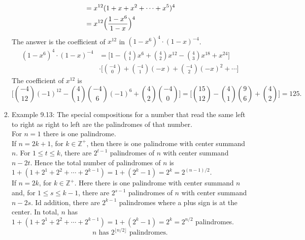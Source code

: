 \documentclass[a4paper]{article}
\begin{document}
\begin{enumerate}
\begin{align*}
        &=x^{12}(1+x+x^2+\cdots+x^5)^4\\
        &=x^{12}\Bigl(\frac{1-x^6}{1-x}\Bigr)^4
    \end{align*}
    The answer is the coefficient of $x^{12}$ in $(1-x^6)^4\cdot (1-x)^{-4}$.
    \begin{align*}
        (1-x^6)^4\cdot (1-x)^{-4}&=\Bigg[1-\binom{4}{1}x^6+\binom{4}{2}x^{12}-\binom{4}{3}x^{18}+x^{24}\Bigg]\\
        &\cdot\Bigg[\binom{-4}{0}+\binom{-4}{1}(-x)+\binom{-4}{2}(-x)^2+\cdots\Bigg]
    \end{align*}
    The coefficient of $x^{12}$ is
    $$
    \Bigg[\binom{-4}{12}(-1)^{12}-\binom{4}{1}\binom{-4}{6}(-1)^6+\binom{4}{2}\binom{-4}{0}\Bigg]=\Bigg[\binom{15}{12}-\binom{4}{1}\binom{9}{6}+\binom{4}{2}\Bigg]=125.
    $$
    \item Example 9.13: The special compositions for a number that read the same left to right as right to left are the palindromes of that number.\\
    For $n=1$ there is one palindrome.\\
    If $n=2k+1$, for $k\in\mathbb{Z}^+$, then there is one palindrome with center summand $n$. For $1\leq t\leq k$, there are $2^{t-1}$ palindromes of $n$ with center summand $n-2t$. Hence the total number of palindromes of $n$ is $1+(1+2^1+2^2+\cdots+2^{k-1})=1+(2^k-1)=2^k=2^{(n-1)/2}$.\\
    If $n=2k$, for $k\in\mathbb{Z}^+$. Here there is one palindrome with center summand $n$ and, for $1\leq s\leq k-1$, there are $2^{s-1}$ palindromes of $n$ with center summand $n-2s$. Id addition, there are $2^{k-1}$ palindromes where a plus sign is at the center. In total, $n$ has $1+(1+2^1+2^2+\cdots+2^{k-1})=1+(2^k-1)=2^k=2^{n/2}$ palindromes.
    $$
    n \text{ has } 2^{\lfloor n/2\rfloor} \text{ palindromes.}
    $$
\end{enumerate}
\end{document}
